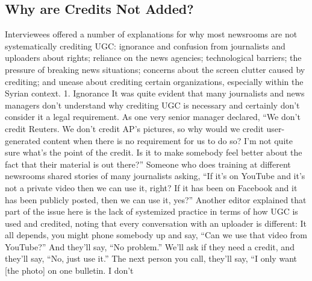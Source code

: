 \begin{enumerate}
\section{Why are Credits Not Added?}
Interviewees offered a number of explanations for why most newsrooms
are not systematically crediting UGC: ignorance and confusion from journalists
and uploaders about rights; reliance on the news agencies; technological
barriers; the pressure of breaking news situations; concerns about
the screen clutter caused by crediting; and unease about crediting certain
organizations, especially within the Syrian context.
1. Ignorance
It was quite evident that many journalists and news managers don't understand
why crediting UGC is necessary and certainly don't consider it a
legal requirement. As one very senior manager declared, ``We don't credit
Reuters. We don't credit AP's pictures, so why would we credit user-generated
content when there is no requirement for us to do so? I'm not quite
sure what's the point of the credit. Is it to make somebody feel better about
the fact that their material is out there?''
Someone who does training at different newsrooms shared stories of many
journalists asking, ``If it's on YouTube and it's not a private video then we
can use it, right? If it has been on Facebook and it has been publicly posted,
then we can use it, yes?''
Another editor explained that part of the issue here is the lack of systemized
practice in terms of how UGC is used and credited, noting that every
conversation with an uploader is different:
It all depends, you might phone somebody up and say, ``Can we use
that video from YouTube?'' And they'll say, ``No problem.'' We'll ask if
they need a credit, and they'll say, ``No, just use it.'' The next person
you call, they'll say, ``I only want [the photo] on one bulletin. I don't


\end{enumerate}
